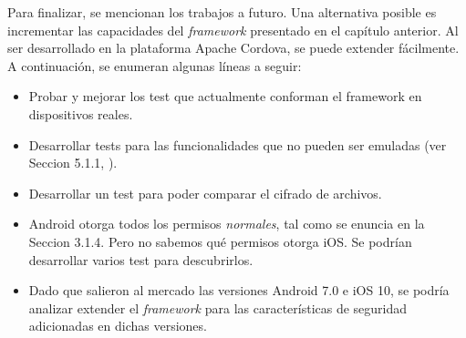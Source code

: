 Para finalizar, se mencionan los trabajos a futuro. Una alternativa posible es incrementar las capacidades del \emph{framework} presentado en el capítulo anterior. Al ser desarrollado en la plataforma Apache Cordova, se puede extender fácilmente. A continuación, se enumeran algunas líneas a seguir:
\begin{itemize}
    \item Probar y mejorar los test que actualmente conforman el framework en dispositivos reales.
    \item Desarrollar tests para las funcionalidades que no pueden ser emuladas (ver Seccion 5.1.1, \cite{foda, foda2}).
    \item Desarrollar un test para poder comparar el cifrado de archivos.
    \item Android otorga todos los permisos \emph{normales}, tal como se enuncia en la Seccion 3.1.4. Pero no sabemos qué permisos otorga iOS. Se podrían desarrollar varios test para descubrirlos.
    \item Dado que salieron al mercado las versiones Android 7.0 e iOS 10, se podría analizar extender el \emph{framework} para las características de seguridad adicionadas en dichas versiones.
\end{itemize}